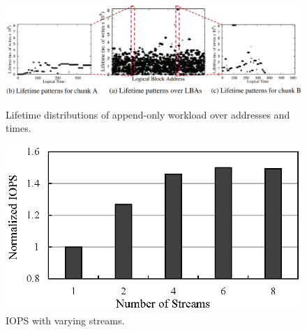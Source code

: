 \begin{figure}[t]
	\includegraphics[width=\linewidth]{figure/fig1}
	\caption{Lifetime distributions of append-only workload over addresses and times.}
	\label{fig:lba_lifetime}
	\endminipage \hfill
	\includegraphics[width=\linewidth]{figure/stream_perf}
	\caption{IOPS with varying streams.}
	\label{fig:stream_perf}
	\endminipage 
\end{figure}

